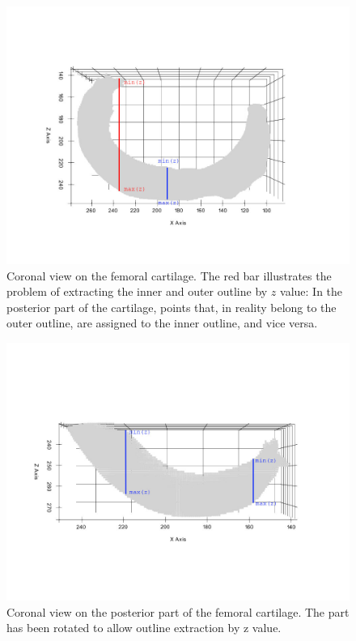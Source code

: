 \begin{figure}[]
	\centering
	\includegraphics[width=\linewidth]{./figures/femur_yz}
	\caption{Coronal view on the femoral cartilage. The red bar illustrates the problem of extracting the inner and outer outline by $z$ value: In the posterior part of the cartilage, points that, in reality belong to the outer outline, are assigned to the inner outline, and vice versa.}
	\label{fig:coronal_femur}
\end{figure}
\begin{figure}[]
	\centering
	\includegraphics[width=\linewidth]{./figures/posterior_femur_yz}
	\caption{Coronal view on the posterior part of the femoral cartilage. The part has been rotated to allow outline extraction by z value.}
	\label{fig:coronal_posterior_femur}
\end{figure}
